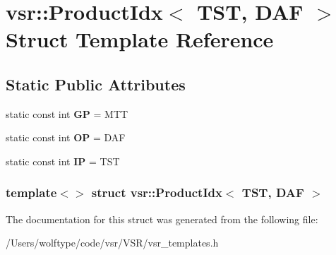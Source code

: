 \hypertarget{structvsr_1_1_product_idx_3_01_t_s_t_00_01_d_a_f_01_4}{\section{vsr\-:\-:Product\-Idx$<$ T\-S\-T, D\-A\-F $>$ Struct Template Reference}
\label{structvsr_1_1_product_idx_3_01_t_s_t_00_01_d_a_f_01_4}
}
\subsection*{Static Public Attributes}
\begin{DoxyCompactItemize}
\item 
\hypertarget{structvsr_1_1_product_idx_3_01_t_s_t_00_01_d_a_f_01_4_a5f17ee55c8373d821aa413e0f9655045}{static const int {\bfseries G\-P} = M\-T\-T}\label{structvsr_1_1_product_idx_3_01_t_s_t_00_01_d_a_f_01_4_a5f17ee55c8373d821aa413e0f9655045}

\item 
\hypertarget{structvsr_1_1_product_idx_3_01_t_s_t_00_01_d_a_f_01_4_a654642bd4259210fb77bb285c834b809}{static const int {\bfseries O\-P} = D\-A\-F}\label{structvsr_1_1_product_idx_3_01_t_s_t_00_01_d_a_f_01_4_a654642bd4259210fb77bb285c834b809}

\item 
\hypertarget{structvsr_1_1_product_idx_3_01_t_s_t_00_01_d_a_f_01_4_ade53399ea223c28ed446effacd5ce41b}{static const int {\bfseries I\-P} = T\-S\-T}\label{structvsr_1_1_product_idx_3_01_t_s_t_00_01_d_a_f_01_4_ade53399ea223c28ed446effacd5ce41b}

\end{DoxyCompactItemize}
\subsubsection*{template$<$$>$ struct vsr\-::\-Product\-Idx$<$ T\-S\-T, D\-A\-F $>$}



The documentation for this struct was generated from the following file\-:\begin{DoxyCompactItemize}
\item 
/\-Users/wolftype/code/vsr/\-V\-S\-R/vsr\-\_\-templates.\-h\end{DoxyCompactItemize}
